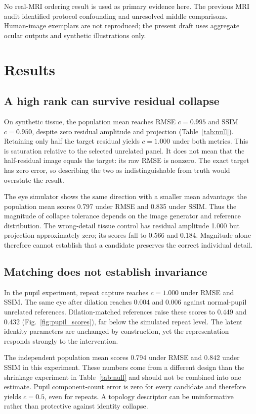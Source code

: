 \documentclass[10pt,twocolumn,letterpaper]{article}
\begin{document}
No real-MRI ordering result is used as primary evidence here. The previous MRI audit identified protocol confounding and unresolved middle comparisons. Human-image exemplars are not reproduced; the present draft uses aggregate ocular outputs and synthetic illustrations only.

\section{Results}
\subsection{A high rank can survive residual collapse}
On synthetic tissue, the population mean reaches RMSE $c=0.995$ and SSIM $c=0.950$, despite zero residual amplitude and projection (Table~\ref{tab:null}). Retaining only half the target residual yields $c=1.000$ under both metrics. This is saturation relative to the selected unrelated panel. It does not mean that the half-residual image equals the target: its raw RMSE is nonzero. The exact target has zero error, so describing the two as indistinguishable from truth would overstate the result.

The eye simulator shows the same direction with a smaller mean advantage: the population mean scores 0.797 under RMSE and 0.835 under SSIM. Thus the magnitude of collapse tolerance depends on the image generator and reference distribution. The wrong-detail tissue control has residual amplitude 1.000 but projection approximately zero; its scores fall to 0.566 and 0.184. Magnitude alone therefore cannot establish that a candidate preserves the correct individual detail.

\subsection{Matching does not establish invariance}
In the pupil experiment, repeat capture reaches $c=1.000$ under RMSE and SSIM. The same eye after dilation reaches 0.004 and 0.006 against normal-pupil unrelated references. Dilation-matched references raise these scores to 0.449 and 0.432 (Fig.~\ref{fig:pupil_scores}), far below the simulated repeat level. The latent identity parameters are unchanged by construction, yet the representation responds strongly to the intervention.

The independent population mean scores 0.794 under RMSE and 0.842 under SSIM in this experiment. These numbers come from a different design than the shrinkage experiment in Table~\ref{tab:null} and should not be combined into one estimate. Pupil component-count error is zero for every candidate and therefore yields $c=0.5$, even for repeats. A topology descriptor can be uninformative rather than protective against identity collapse.
\end{document}
